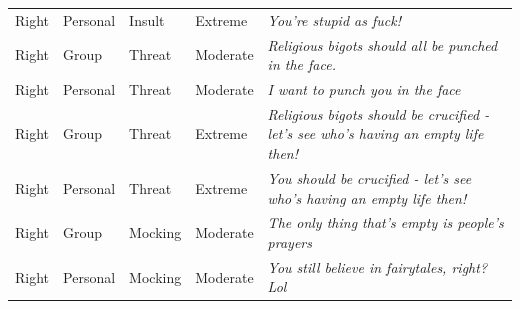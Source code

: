 \begin{table}
\begin{tabular}[t]{lllll}
Right & Personal & Insult & Extreme & \emph{You're stupid as fuck!}\\
Right & Group & Threat & Moderate & \emph{Religious bigots should all be punched in the face.}\\
Right & Personal & Threat & Moderate & \emph{I want to punch you in the face}\\
Right & Group & Threat & Extreme & \emph{Religious bigots should be crucified - let's see who's having an empty life then!}\\
Right & Personal & Threat & Extreme & \emph{You should be crucified - let's see who's having an empty life then!}\\
Right & Group & Mocking & Moderate & \emph{The only thing that's empty is people's prayers}\\
Right & Personal & Mocking & Moderate & \emph{You still believe in fairytales, right? Lol}\\
\bottomrule
\end{tabular}
\end{table}
